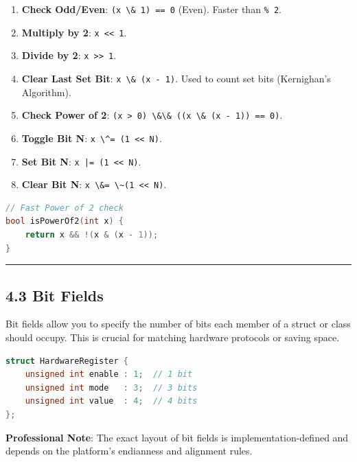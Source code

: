 \begin{enumerate}
\def\labelenumi{\arabic{enumi}.}
\tightlist
\item
  \textbf{Check Odd/Even}: \passthrough{\lstinline!(x \& 1) == 0!}
  (Even). Faster than \passthrough{\lstinline!\% 2!}.
\item
  \textbf{Multiply by 2}: \passthrough{\lstinline!x << 1!}.
\item
  \textbf{Divide by 2}: \passthrough{\lstinline!x >> 1!}.
\item
  \textbf{Clear Last Set Bit}: \passthrough{\lstinline!x \& (x - 1)!}.
  Used to count set bits (Kernighan's Algorithm).
\item
  \textbf{Check Power of 2}:
  \passthrough{\lstinline!(x > 0) \&\& ((x \& (x - 1)) == 0)!}.
\item
  \textbf{Toggle Bit N}: \passthrough{\lstinline!x \^= (1 << N)!}.
\item
  \textbf{Set Bit N}: \passthrough{\lstinline!x |= (1 << N)!}.
\item
  \textbf{Clear Bit N}: \passthrough{\lstinline!x \&= \~(1 << N)!}.
\end{enumerate}

\begin{lstlisting}[language={C++}]
// Fast Power of 2 check
bool isPowerOf2(int x) {
    return x && !(x & (x - 1));
}
\end{lstlisting}

\begin{center}\rule{0.5\linewidth}{0.5pt}\end{center}

\hypertarget{bit-fields}{%
\subsection{4.3 Bit Fields}\label{bit-fields}}

Bit fields allow you to specify the number of bits each member of a
struct or class should occupy. This is crucial for matching hardware
protocols or saving space.

\begin{lstlisting}[language={C++}]
struct HardwareRegister {
    unsigned int enable : 1;  // 1 bit
    unsigned int mode   : 3;  // 3 bits
    unsigned int value  : 4;  // 4 bits
};
\end{lstlisting}

\textbf{Professional Note}: The exact layout of bit fields is
implementation-defined and depends on the platform's endianness and
alignment rules.

